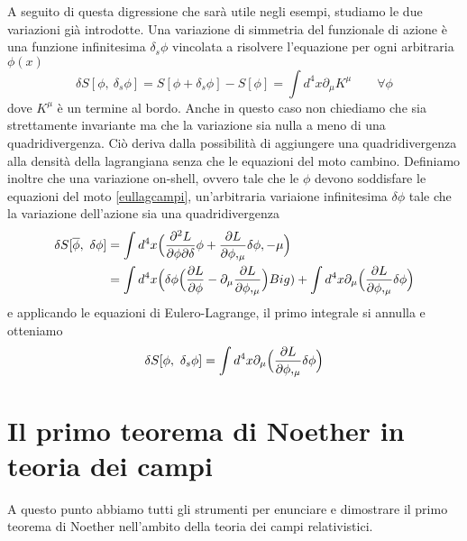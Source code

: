     A seguito di questa digressione che sarà utile negli esempi, studiamo le due variazioni già introdotte. Una variazione di simmetria del funzionale di azione è una funzione infinitesima $\delta_s \phi$ vincolata a risolvere l'equazione per ogni arbitraria $\phi(x)$
\begin{equation} \label{invazionecampi}
    \delta S[\phi, ~\delta_s \phi] = S[\phi + \delta_s \phi] - S[\phi] = \int d^4 x \partial_\mu K^\mu \qquad \forall \phi
\end{equation}  
    dove $K^\mu$ è un termine al bordo. Anche in questo caso non chiediamo che sia strettamente invariante ma che la variazione sia nulla a meno di una quadridivergenza. Ciò deriva dalla possibilità di aggiungere una quadridivergenza alla densità della lagrangiana senza che le equazioni del moto cambino. Definiamo inoltre che una variazione on-shell, ovvero tale che le $\phi$ devono soddisfare le equazioni del moto \eqref{eullagcampi}, un'arbitraria variaione infinitesima $\delta \phi$ tale che la variazione dell'azione sia una quadridivergenza
\begin{equation}
\begin{aligned}
    \delta S[\overline \phi, ~\delta \phi] & = \int d^4 x \Big(\frac{\partial^2 L}{\partial\phi \partial\delta} \phi + \frac{\partial L}{\partial\phi,_\mu} \delta \phi,-\mu \Big) \\ & = \int d^4 x \Big ( \delta \phi \Big (\frac{\partial L}{\partial\phi} - \partial_\mu \frac{\partial L}{\partial\phi,_\mu} \Big ) Big) + \int d^4 x \partial_\mu \Big ( \frac{\partial L}{\partial\phi,_\mu}  \delta \phi \Big)
\end{aligned}
\end{equation}
    e applicando le equazioni di Eulero-Lagrange, il primo integrale si annulla e otteniamo 
\begin{equation} \label{invonshellcampi}
    \delta S[\phi, ~\delta_s \phi] = \int d^4 x \partial_\mu \Big ( \frac{\partial L}{\partial\phi,_\mu}  \delta \phi \Big)
\end{equation}

\section{Il primo teorema di Noether in teoria dei campi}
    A questo punto abbiamo tutti gli strumenti per enunciare e dimostrare il primo teorema di Noether nell'ambito della teoria dei campi relativistici.

